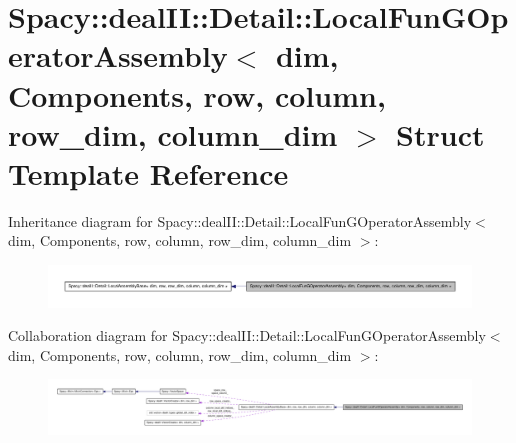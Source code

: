 \hypertarget{structSpacy_1_1dealII_1_1Detail_1_1LocalFunGOperatorAssembly}{\section{\-Spacy\-:\-:deal\-I\-I\-:\-:\-Detail\-:\-:\-Local\-Fun\-G\-Operator\-Assembly$<$ dim, \-Components, row, column, row\-\_\-dim, column\-\_\-dim $>$ \-Struct \-Template \-Reference}
\label{structSpacy_1_1dealII_1_1Detail_1_1LocalFunGOperatorAssembly}
}


\-Inheritance diagram for \-Spacy\-:\-:deal\-I\-I\-:\-:\-Detail\-:\-:\-Local\-Fun\-G\-Operator\-Assembly$<$ dim, \-Components, row, column, row\-\_\-dim, column\-\_\-dim $>$\-:
\nopagebreak
\begin{figure}[H]
\begin{center}
\leavevmode
\includegraphics[width=350pt]{structSpacy_1_1dealII_1_1Detail_1_1LocalFunGOperatorAssembly__inherit__graph}
\end{center}
\end{figure}


\-Collaboration diagram for \-Spacy\-:\-:deal\-I\-I\-:\-:\-Detail\-:\-:\-Local\-Fun\-G\-Operator\-Assembly$<$ dim, \-Components, row, column, row\-\_\-dim, column\-\_\-dim $>$\-:
\nopagebreak
\begin{figure}[H]
\begin{center}
\leavevmode
\includegraphics[width=350pt]{structSpacy_1_1dealII_1_1Detail_1_1LocalFunGOperatorAssembly__coll__graph}
\end{center}
\end{figure}
